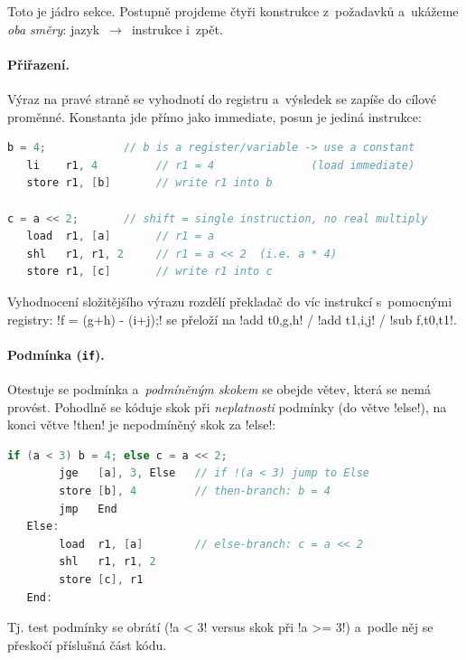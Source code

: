 Toto je jádro sekce. Postupně projdeme čtyři konstrukce z~požadavků a~ukážeme \emph{oba směry}: jazyk~$\to$~instrukce i~zpět.

\paragraph{Přiřazení.} Výraz na pravé straně se vyhodnotí do registru a~výsledek se zapíše do cílové proměnné. Konstanta jde přímo jako immediate, posun je jediná instrukce:
\begin{lstlisting}[language=C]
b = 4;            // b is a register/variable -> use a constant
   li    r1, 4         // r1 = 4               (load immediate)
   store r1, [b]       // write r1 into b

c = a << 2;       // shift = single instruction, no real multiply
   load  r1, [a]       // r1 = a
   shl   r1, r1, 2     // r1 = a << 2  (i.e. a * 4)
   store r1, [c]       // write r1 into c
\end{lstlisting}
Vyhodnocení složitějšího výrazu rozdělí překladač do víc instrukcí s~pomocnými registry: \cd!f = (g+h) - (i+j);! se přeloží na \cd!add t0,g,h! / \cd!add t1,i,j! / \cd!sub f,t0,t1!.

\paragraph{Podmínka (\texttt{if}).} Otestuje se podmínka a~\emph{podmíněným skokem} se obejde větev, která se nemá provést. Pohodlně se kóduje skok při \emph{neplatnosti} podmínky (do větve \cd!else!), na konci větve \cd!then! je nepodmíněný skok za \cd!else!:
\begin{lstlisting}[language=C]
if (a < 3) b = 4; else c = a << 2;
        jge   [a], 3, Else   // if !(a < 3) jump to Else
        store [b], 4         // then-branch: b = 4
        jmp   End
   Else:
        load  r1, [a]        // else-branch: c = a << 2
        shl   r1, r1, 2
        store [c], r1
   End:
\end{lstlisting}
Tj. test podmínky se obrátí (\cd!a < 3! versus skok při \cd!a >= 3!) a~podle něj se přeskočí příslušná část kódu.

